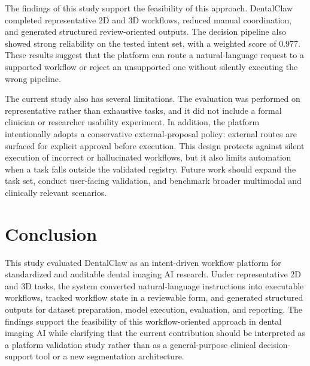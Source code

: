 \documentclass[final,5p,times,twocolumn]{elsarticle}
\begin{document}
The findings of this study support the feasibility of this approach. DentalClaw completed representative 2D and 3D workflows, reduced manual coordination, and generated structured review-oriented outputs. The decision pipeline also showed strong reliability on the tested intent set, with a weighted score of 0.977. These results suggest that the platform can route a natural-language request to a supported workflow or reject an unsupported one without silently executing the wrong pipeline.

The current study also has several limitations. The evaluation was performed on representative rather than exhaustive tasks, and it did not include a formal clinician or researcher usability experiment. In addition, the platform intentionally adopts a conservative external-proposal policy: external routes are surfaced for explicit approval before execution. This design protects against silent execution of incorrect or hallucinated workflows, but it also limits automation when a task falls outside the validated registry. Future work should expand the task set, conduct user-facing validation, and benchmark broader multimodal and clinically relevant scenarios.

\section{Conclusion}
This study evaluated DentalClaw as an intent-driven workflow platform for standardized and auditable dental imaging AI research. Under representative 2D and 3D tasks, the system converted natural-language instructions into executable workflows, tracked workflow state in a reviewable form, and generated structured outputs for dataset preparation, model execution, evaluation, and reporting. The findings support the feasibility of this workflow-oriented approach in dental imaging AI while clarifying that the current contribution should be interpreted as a platform validation study rather than as a general-purpose clinical decision-support tool or a new segmentation architecture.

\newpage
\footnotesize


\end{document}
